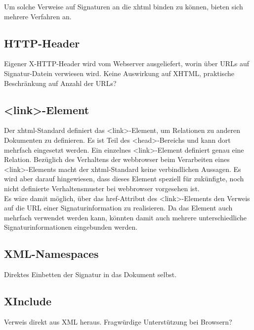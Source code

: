 Um solche Verweise auf Signaturen an die \gls{xhtml} binden zu können, bieten sich mehrere Verfahren an.

\subsection{HTTP-Header}
Eigener X-HTTP-Header wird vom Webserver ausgeliefert, worin über URLs auf Signatur-Datein verwiesen wird. Keine Auswirkung auf XHTML, praktische Beschränkung
auf Anzahl der URLs?

\subsection{<link>-Element}
Der \gls{xhtml}-Standard definiert das <link>-Element, um Relationen zu anderen Dokumenten zu definieren. Es ist Teil des <head>-Bereichs und kann dort mehrfach
eingesetzt werden. Ein einzelnes <link>-Element definiert genau eine Relation. Bezüglich des Verhaltens der \gls{webbrowser} beim Verarbeiten eines
<link>-Elements macht der \gls{xhtml}-Standard keine verbindlichen Aussagen. Es wird aber darauf hingewiesen, dass dieses Element speziell für zukünfigte, noch
nicht definierte Verhaltensmuster bei \Gls{webbrowser} vorgesehen ist.\\
Es wäre damit möglich, über das href-Attribut des <link>-Elements den Verweis auf die URL einer Signaturinformation zu realisieren. Da das Element auch mehrfach
verwendet werden kann, könnten damit auch mehrere unterschiedliche Signaturinformationen eingebunden werden.

\subsection{XML-Namespaces}
Direktes Einbetten der Signatur in das Dokument selbst.

\subsection{XInclude}
Verweis direkt aus XML heraus. Fragwürdige Unterstützung bei Browsern?
